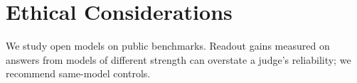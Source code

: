\documentclass[11pt]{article}
\begin{document}
\section*{Ethical Considerations}

We study open models on public benchmarks. Readout gains measured on answers from models of different strength can overstate a judge's reliability; we recommend same-model controls.



\appendix

\end{document}
